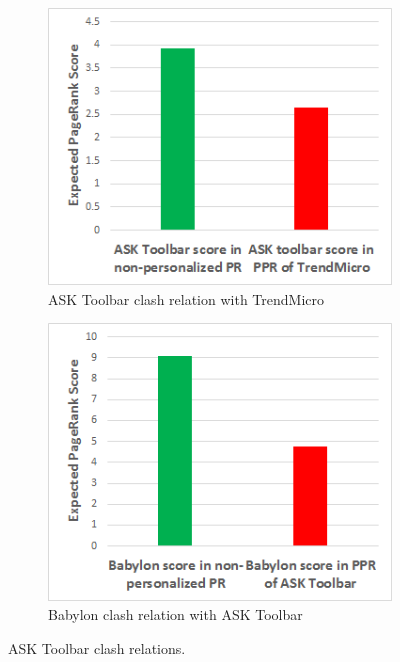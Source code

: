 \documentclass[ijoc,nonblindrev]{informs3} %
\numberwithin{equation}{subsection}
\begin{document}
\begin{figure}[!htbp]
\centering
\begin{subfigure}[b]{0.4\textwidth}
	\centering
\includegraphics[width=\textwidth]{figures/ask_clash_trend1.png}
\caption{ASK Toolbar clash relation with TrendMicro}
\label{fig:ask_clash_trend}
\end{subfigure}
\begin{subfigure}[b]{0.4\textwidth}
	\centering
\includegraphics[width=\textwidth]{figures/babylon_nosym_ask1.png}
\caption{Babylon clash relation with ASK Toolbar}
\label{fig:babylon_nosym_ask}
\end{subfigure}
\caption{ASK Toolbar clash relations.}
	\label{fig:clash_1}
\end{figure}
\end{document}
